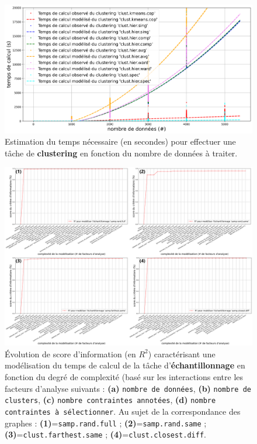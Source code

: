 			\begin{figure}[!htb]
				\centering
				\includegraphics[width=\textwidth]{figures/etude-temps-calcul-modelisation-3clust}
				\caption{Estimation du temps nécessaire (en secondes) pour effectuer une tâche de \textbf{clustering} en fonction du nombre de données à traiter.}
				\label{figure:4.3.1-ETUDE-COUTS-TEMPS-CALCUL-MODELISATION-CLUSTERING}
			\end{figure}
			
			
			\begin{figure}[!htb]
				\centering
				\includegraphics[width=\textwidth]{figures/etude-temps-calcul-analyse-facteurs-4samp}
				\caption{Évolution de score d'information (en \(R^2\)) caractérisant une modélisation du temps de calcul de la tâche d'\textbf{échantillonnage} en fonction du degré de complexité (basé sur les interactions entre les facteurs d'analyse suivants : \textbf{(a)} \texttt{nombre de données}, \textbf{(b)} \texttt{nombre de clusters}, \textbf{(c)} \texttt{nombre contraintes annotées}, \textbf{(d)} \texttt{nombre contraintes à sélectionner}. Au sujet de la correspondance des graphes : \textbf{(1)}=\texttt{samp.rand.full} ; \textbf{(2)}=\texttt{samp.rand.same} ; \textbf{(3)}=\texttt{clust.farthest.same} ; \textbf{(4)}=\texttt{clust.closest.diff}.}
				\label{figure:4.3.1-ETUDE-COUTS-TEMPS-CALCUL-ANALYSE-FACTEURS-SAMPLING}
			\end{figure}
		
